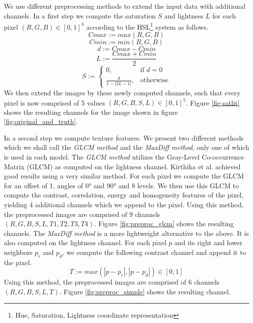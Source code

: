 \documentclass[10pt,conference,compsocconf]{IEEEtran}
\begin{document}
We use different preprocessing methods to extend the input data with additional channels.
In a first step we compute the saturation $S$ and lightness $L$ for each pixel $(R,G,B) \in [0,1]^3$ according to the HSL\footnote{Hue, Saturation, Lightness coordinate representation} system as follows.
$$ Cmax := max(R,G,B) $$
$$ Cmin := min(R,G,B) $$
$$d := Cmax - Cmin$$
$$ L := \frac{Cmax + Cmin}{2} $$
\[
S :=
\begin{cases}
	0, & \text{if } d = 0\\
	\frac{d}{1-|2L-1|}, & \text{otherwise}
\end{cases}
\]
We then extend the images by these newly computed channels, such that every pixel is now comprised of 5 values $(R,G,B,S,L) \in [0,1]^5$. Figure \ref{fig:satlit} shows the resulting channels for the image shown in figure \ref{fig:original_and_truth}.

In a second step we compute texture features.
We present two different methods which we shall call the \emph{GLCM method} and the \emph{MaxDiff method}, only one of which is used in each model.
The \emph{GLCM method} utilizes the Gray-Level Co-occurrence Matrix (GLCM) \cite{glcm} as computed on the lightness channel.
Kirthika et al. \cite{kirthika2011automated} achieved good results using a very similar method.
For each pixel we compute the GLCM for an offset of 1, angles of 0° and 90° and 8 levels.
We then use this GLCM to compute the contrast, correlation, energy and homogeneity features of the pixel, yielding 4 additional channels which we append to the pixel.
Using this method, the preprocessed images are comprised of 9 channels $(R,G,B,S,L,T1,T2,T3,T4)$.
Figure \ref{fig:preproc_glcm} shows the resulting channels.
The \emph{MaxDiff method} is a more lightweight alternative to the above.
It is also computed on the lightness channel.
For each pixel $p$ and its right and lower neighbors $p_r$ and $p_d$, we compute the following contrast channel and append it to the pixel.
$$ T := max(|p-p_r|,|p-p_d|) \in [0,1] $$
Using this method, the preprocessed images are comprised of 6 channels $(R,G,B,S,L,T)$.
Figure \ref{fig:preproc_simple} shows the resulting channel.
\end{document}
